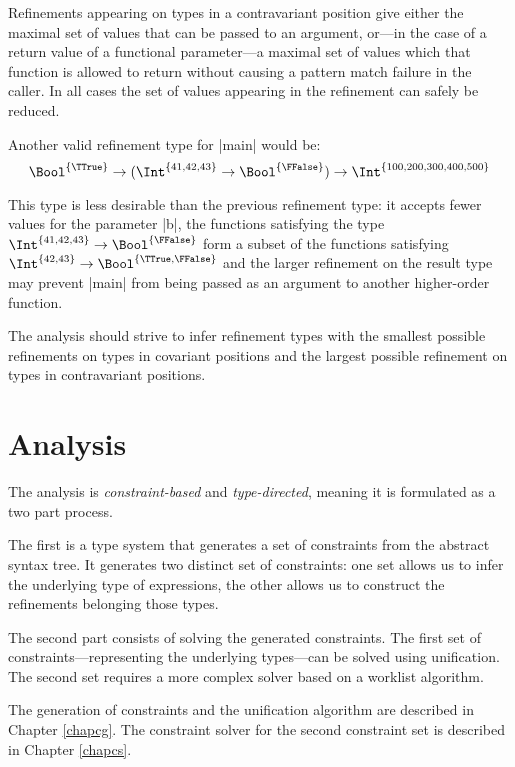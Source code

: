 Refinements appearing on types in a contravariant position give either the maximal set of values that can be passed to an argument, or---in the case of a return value of a functional parameter---a maximal set of values which that function is allowed to return without causing a pattern match failure in the caller. In all cases the set of values appearing in the refinement can safely be reduced.

Another valid refinement type for |main| would be: \[ \Bool^{\{\TTrue\}} \to (\Int^{\{41, 42, 43\}}\to\Bool^{\{\FFalse\}})\to \Int^{\{100,200,300,400,500\}}\]

This type is less desirable than the previous refinement type: it accepts fewer values for the parameter |b|, the functions satisfying the type $\Int^{\{41, 42, 43\}}\to\Bool^{\{\FFalse\}}$ form a subset of the functions satisfying $\Int^{\{42, 43\}}\to\Bool^{\{\TTrue,\FFalse\}}$ and the larger refinement on the result type may prevent |main| from being passed as an argument to another higher-order function.

The analysis should strive to infer refinement types with the smallest possible refinements on types in covariant positions and the largest possible refinement on types in contravariant positions.

\section{Analysis}\label{sec33}

The analysis is \emph{constraint-based} and \emph{type-directed}, meaning it is formulated as a two part process.

The first is a type system that generates a set of constraints from the abstract syntax tree. It generates two distinct set of constraints: one set allows us to infer the underlying type of expressions, the other allows us to construct the refinements belonging those types.

The second part consists of solving the generated constraints. The first set of constraints---representing the underlying types---can be solved using unification. The second set requires a more complex solver based on a worklist algorithm.

The generation of constraints and the unification algorithm are described in Chapter \ref{chapcg}. The constraint solver for the second constraint set is described in Chapter \ref{chapcs}.


